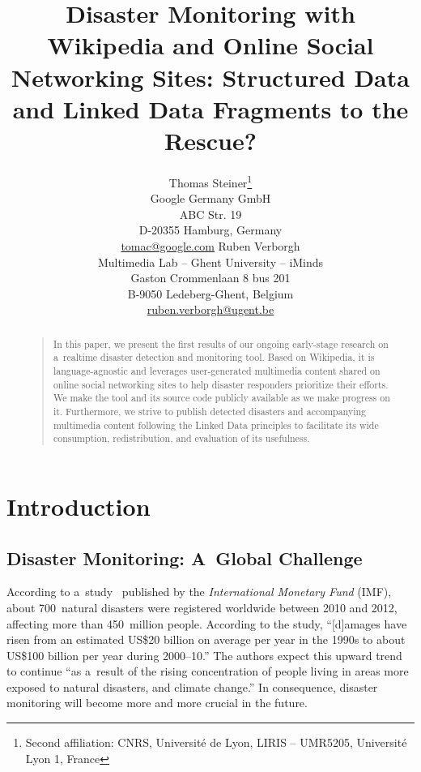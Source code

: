 \documentclass[letterpaper]{article}
\begin{document}
\title{Disaster Monitoring with Wikipedia and Online Social Networking Sites: Structured Data and Linked Data Fragments to the Rescue?}
\author{Thomas Steiner\thanks{Second affiliation: CNRS, Université de Lyon, LIRIS -- UMR5205, Université Lyon 1, France}\\
Google Germany GmbH\\
ABC Str. 19\\
D-20355 Hamburg, Germany\\
\url{tomac@google.com}
\And
Ruben Verborgh\\
Multimedia Lab -- Ghent University -- iMinds\\
Gaston Crommenlaan 8 bus 201\\
B-9050 Ledeberg-Ghent, Belgium\\
\url{ruben.verborgh@ugent.be}
}
\maketitle
\begin{abstract}
\begin{quote}
In this paper, we present the first results of
our ongoing early-stage research
on a~realtime disaster detection and monitoring tool.
Based on Wikipedia, it is language-agnostic
and leverages user-generated multimedia content
shared on online social networking sites
to help disaster responders prioritize their efforts.
We make the tool and its source code publicly available
as we make progress on it.
Furthermore, we strive to publish detected disasters
and accompanying multimedia content
following the Linked Data principles
to facilitate its wide consumption,
redistribution, and evaluation of its usefulness.

\end{quote}
\end{abstract}

\section{Introduction}

\subsection{Disaster Monitoring: A~Global Challenge}
\label{sec:natural-disaster-detection}

According to a~study~\cite{laframboise2012naturaldisasters}
published by the \emph{International Monetary Fund} (IMF),
about 700~natural disasters were registered worldwide between 2010 and 2012,
affecting more than 450~million people.
According to the study, ``[d]amages have risen
from an estimated US\$20 billion on average per year
in the 1990s to about US\$100 billion per year during 2000--10.''
The authors expect this upward trend to continue
``as a~result of the rising concentration of people
living in areas more exposed to natural disasters,
and climate change.''
In consequence, disaster monitoring will
become more and more crucial in the future.
\end{document}
